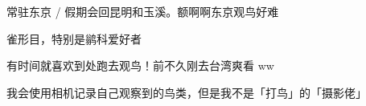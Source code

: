
\begin{kuolieitems}
  \item 常驻东京 / 假期会回昆明和玉溪。额啊啊东京观鸟好难
  \item 雀形目，特别是鹟科爱好者
  \item 有时间就喜欢到处跑去观鸟！前不久刚去台湾爽看 ww
  \item 我会使用相机记录自己观察到的鸟类，但是我不是「打鸟」的「摄影佬」
\end{kuolieitems}
